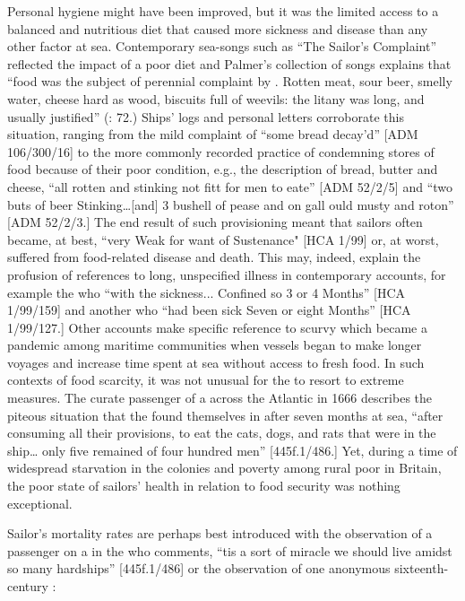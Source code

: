   Personal hygiene might have been improved, but it was the limited access to a balanced and nutritious diet that caused more sickness and disease than any other factor at sea. Contemporary sea-songs such as “The Sailor’s Complaint” reflected the impact of a poor diet and Palmer’s collection of songs explains that “food was the subject of perennial complaint by . Rotten meat, sour beer, smelly water, cheese hard as wood, biscuits full of weevils: the litany was long, and usually justified” (\citealt{Palmer1986}: 72.) Ships’ logs and personal letters corroborate this situation, ranging from the mild complaint of “some bread decay'd” [ADM 106/300/16] to the more commonly recorded practice of condemning stores of food because of their poor condition, e.g., the description of bread, butter and cheese, “all rotten and stinking not fitt for men to eate” [ADM 52/2/5] and “two buts of beer Stinking…[and] 3 bushell of pease and on gall ould musty and roton” [ADM 52/2/3.] The end result of such provisioning meant that sailors often became, at best, “very Weak for want of Sustenance" [HCA 1/99] or, at worst, suffered from food-related disease and death. This may, indeed, explain the profusion of references to long, unspecified illness in contemporary accounts, for example the  who “with the sickness... Confined so 3 or 4 Months” [HCA 1/99/159] and another who “had been sick Seven or eight Months” [HCA 1/99/127.] Other accounts make specific reference to scurvy which became a pandemic among maritime communities when vessels began to make longer voyages and increase time spent at sea without access to fresh food. In such contexts of food scarcity, it was not unusual for the  to resort to extreme measures. The curate passenger of a  across the Atlantic in 1666 describes the piteous situation that the  found themselves in after seven months at sea, “after consuming all their provisions, to eat the cats, dogs, and rats that were in the ship… only five remained of four hundred men” [445f.1/486.] Yet, during a time of widespread starvation in the colonies and poverty among rural poor in Britain, the poor state of sailors’ health in relation to food security was nothing exceptional. 

  Sailor’s mortality rates are perhaps best introduced with the observation of a passenger on a   in the  who comments, “tis a sort of miracle we should live amidst so many hardships” [445f.1/486] or the observation of one anonymous sixteenth-century :


